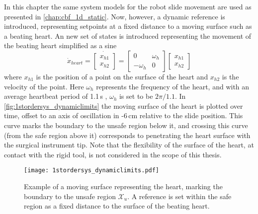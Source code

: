 In this chapter the same system models for the robot slide movement are used as presented in \autoref{chap:cbf_1d_static}. Now, however, a dynamic reference is introduced, representing setpoints at a fixed distance to a moving surface such as a beating heart. An new set of states is introduced representing the movement of the beating heart simplified as a sine
\begin{equation}
\dot{x}_{heart} =
\dot{\begin{bmatrix}
x_{h1}\\x_{h2}
\end{bmatrix}} =
\begin{bmatrix}
0 & \omega_h \\ -\omega_h & 0
\end{bmatrix}
\begin{bmatrix}
x_{h1}\\x_{h2}
\end{bmatrix}
\end{equation}
where $x_{h1}$ is the position of a point on the surface of the heart and $x_{h2}$ is the velocity of the point.
Here $\omega_h$ represents the frequency of the heart, and with an average heartbeat period of 1.1\,s \citep{bib:heart_berkeley}, $\omega_h$ is set to be $2\pi/1.1$. In \autoref{fig:1stordersys_dynamiclimits} the moving surface of the heart is plotted over time, offset to an axis of oscillation in -6\,cm relative to the slide position. This curve marks the boundary to the unsafe region below it, and crossing this curve (from the safe region above it) corresponds to penetrating the heart surface with the surgical instrument tip. Note that the flexibility of the surface of the heart, at contact with the rigid tool, is not considered in the scope of this thesis. 

\begin{figure}[htbp]
	\centering
	\texttt{[image: 1stordersys\_dynamiclimits.pdf]}
	\caption{Example of a moving surface representing the heart, marking the boundary to the unsafe region $\mathcal{X}_u$. A reference is set within the safe region as a fixed distance to the surface of the beating heart.}
	\label{fig:1stordersys_dynamiclimits}
\end{figure}

